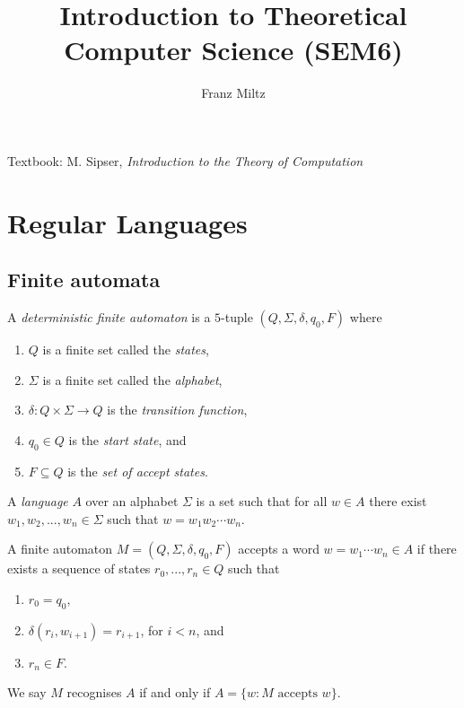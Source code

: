 \documentclass{article}
\title{Introduction to Theoretical Computer Science (SEM6)}
\author{Franz Miltz}
\begin{document}
\maketitle
\noindent Textbook: M. Sipser, \emph{Introduction to the Theory of Computation}
\tableofcontents
\pagebreak

\section{Regular Languages}

\subsection{Finite automata}

\begin{definition}
    A \emph{deterministic finite automaton} is a $5$-tuple $(Q,\Sigma,\delta,q_0,F)$ where 
    \begin{enumerate}
        \item $Q$ is a finite set called the \emph{states},
        \item $\Sigma$ is a finite set called the \emph{alphabet},
        \item $\delta:Q\times\Sigma\to Q$ is the \emph{transition function},
        \item $q_0\in Q$ is the \emph{start state}, and 
        \item $F\subseteq Q$ is the \emph{set of accept states}.
    \end{enumerate} 
\end{definition}

\begin{definition}
    A \emph{language} $A$ over an alphabet $\Sigma$ is a set such that for all 
    $w\in A$ there exist $w_1,w_2,...,w_n\in\Sigma$ such that $w=w_1w_2\cdots w_n$.
    
    A finite automaton $M=(Q,\Sigma,\delta,q_0,F)$ accepts a word $w=w_1\cdots w_n\in A$ 
    if there exists a sequence of states $r_0,...,r_n\in Q$ such that 
    \begin{enumerate}
        \item $r_0=q_0$,
        \item $\delta(r_i,w_{i+1})=r_{i+1}$, for $i<n$, and 
        \item $r_n\in F$.
    \end{enumerate}
    We say $M$ recognises $A$ if and only if $A=\{w : M\text{ accepts }w\}$.
\end{definition}
\end{document}
